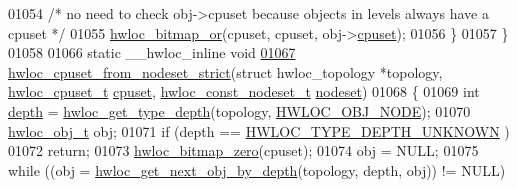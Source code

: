 \begin{DoxyCode}
01054                         \textcolor{comment}{/* no need to check obj->cpuset because objects in levels
       always have a cpuset */}
01055                         \hyperlink{a00065_ga1ba1de709ee9a7cf5cc8ad2d9a1a81d4}{hwloc_bitmap_or}(cpuset, cpuset, obj->\hyperlink{a00016_a67925e0f2c47f50408fbdb9bddd0790f}{cpuset});
01056         \}
01057 \}
01058 
01066 \textcolor{keyword}{static} \_\_hwloc\_inline \textcolor{keywordtype}{void}
\hypertarget{a00031_source_l01067}{}\hyperlink{a00062_gaa7c3f39802b00a758c58e024a8119979}{01067} \hyperlink{a00062_gaa7c3f39802b00a758c58e024a8119979}{hwloc_cpuset_from_nodeset_strict}(\textcolor{keyword}{struct} hwloc\_topology *topology, \hyperlink{a00040_ga4bbf39b68b6f568fb92739e7c0ea7801}{hwloc_cpuset_t} 
      \hyperlink{a00016_a67925e0f2c47f50408fbdb9bddd0790f}{cpuset}, \hyperlink{a00040_ga2f5276235841ad66a79bedad16a5a10c}{hwloc_const_nodeset_t} \hyperlink{a00016_a08f0d0e16c619a6e653526cbee4ffea3}{nodeset})
01068 \{
01069         \textcolor{keywordtype}{int} \hyperlink{a00016_a9d82690370275d42d652eccdea5d3ee5}{depth} = \hyperlink{a00046_gaea7c64dd59467f5201ba87712710b14d}{hwloc_get_type_depth}(topology, \hyperlink{a00041_ggacd37bb612667dc437d66bfb175a8dc55aaf0964881117bdedf1a5e9332cd120dd}{HWLOC_OBJ_NODE});
01070         \hyperlink{a00016}{hwloc_obj_t} obj;
01071         \textcolor{keywordflow}{if} (depth == \hyperlink{a00046_ggaf4e663cf42bbe20756b849c6293ef575a0565ab92ab72cb0cec91e23003294aad}{HWLOC_TYPE_DEPTH_UNKNOWN} )
01072                 \textcolor{keywordflow}{return};
01073         \hyperlink{a00065_ga6c540b9fe63b8223b6aba46d56dd63b8}{hwloc_bitmap_zero}(cpuset);
01074         obj = NULL;
01075         \textcolor{keywordflow}{while} ((obj = \hyperlink{a00053_gab7c1dce3f42ece5bfa621e87cf332418}{hwloc_get_next_obj_by_depth}(topology, depth, obj)) != NULL)
      

\end{DoxyCode}
